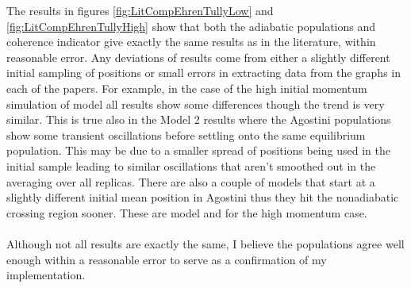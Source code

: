 The results in figures \ref{fig:LitCompEhrenTullyLow} and \ref{fig:LitCompEhrenTullyHigh} show that both the adiabatic populations and coherence indicator give exactly the same results as in the literature, within reasonable error.  Any deviations of results come from either a slightly different initial sampling of positions or small errors in extracting data from the graphs in each of the papers. For example, in the case of the high initial momentum simulation of model  all  results show some differences though the trend is very similar. This is true also in the Model 2 results where the Agostini populations show some transient oscillations before settling onto the same equilibrium population. This may be due to a smaller spread of positions being used in the initial sample leading to similar oscillations that aren't smoothed out in the averaging over all replicas. There are also a couple of models that start at a slightly different initial mean position in Agostini \cite{agostini_quantum-classical_2016} thus they hit the nonadiabatic crossing region sooner. These are model  and  for the high momentum case.
\\\\
Although not all results are exactly the same, I believe the populations agree well enough within a reasonable error to serve as a confirmation of my implementation.
